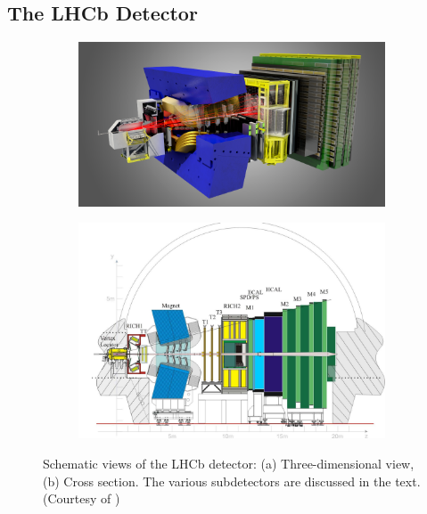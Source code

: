 \subsection{The LHCb Detector}
\label{subsec:intro_LHCb_detector}

\begin{figure}[p]
  \centering
  \begin{subfigure}{\textwidth}
    \includegraphics[width=\textwidth]{graphics/intro/detector_3D}
    \caption{}
    \label{fig:LHCb_3D}
  \end{subfigure}

  \vspace*{0.05\textwidth}
  \begin{subfigure}{\textwidth}
    \includegraphics[width=\textwidth]{graphics/intro/detector_cross}
    \caption{}
    \label{fig:LHCb_cross}
  \end{subfigure}

  \caption{Schematic views of the LHCb detector: (a) Three-dimensional view, (b) Cross section. The various subdetectors are discussed in
           the text. (Courtesy of \cern)}
  \label{fig:LHCb}
\end{figure}

